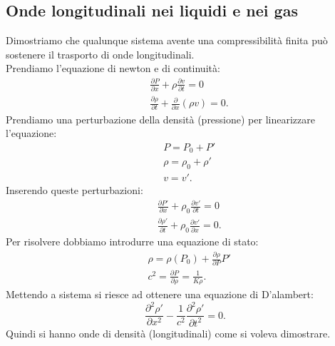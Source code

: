 \subsection{Onde longitudinali nei liquidi e nei gas}%
\label{sub:Onde longitudinali nei liquidi e nei gas}
Dimostriamo che qualunque sistema avente una compressibilità finita può sostenere il trasporto di onde longitudinali. \\
Prendiamo l'equazione di newton e di continuità:
\[\begin{aligned}
    &\frac{\partial P}{\partial x} + \rho\frac{\partial v}{\partial t} = 0\\
    &\frac{\partial \rho}{\partial t} + \frac{\partial }{\partial x} (\rho v) = 0 
.\end{aligned}\]
Prendiamo una perturbazione della densità (pressione) per linearizzare l'equazione:
\[\begin{aligned}
    &P=P_0+P'\\
    &\rho =\rho_0+\rho'\\
    &v=v'
.\end{aligned}\]
Inserendo queste perturbazioni:
\[\begin{aligned}
    &\frac{\partial P'}{\partial x} + \rho_0 \frac{\partial v'}{\partial t} = 0\\
    &\frac{\partial \rho'}{\partial t} + \rho_0 \frac{\partial v'}{\partial x} = 0
.\end{aligned}\]
Per risolvere dobbiamo introdurre una equazione di stato:
\[\begin{aligned}
    &\rho =\rho (P_0) + \frac{\partial \rho}{\partial P} P'\\
    &c^2=\frac{\partial P}{\partial \rho} = \frac{1}{K\rho}
.\end{aligned}\]
Mettendo a sistema si riesce ad ottenere una equazione di D'alambert:
\[
    \frac{\partial ^2\rho'}{\partial x^2}-\frac{1}{c^2}\frac{\partial ^2\rho'}{\partial t^2}  = 0
.\] 
Quindi si hanno onde di densità (longitudinali) come si voleva dimostrare.
